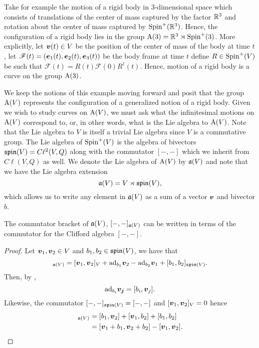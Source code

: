 \documentclass[conf]{new-aiaa}
\begin{document}
\begin{example}
Take for example the motion of a rigid body in 3-dimensional space which consists of translations of the center of mass captured by the factor $\mathbb{R}^3$ and rotation about the center of mass captured by $\operatorname{Spin}^+(\mathbb{R}^3)$. Hence, the configuration of a rigid body lies in the group $\operatorname{A}(3)=\mathbb{R}^3 \rtimes \operatorname{Spin}^+(3)$. More explicitly, let $\boldsymbol{v}(t) \in V$ be the position of the center of mass of the body at time $t$, let $\mathscr{F}(t)=(\boldsymbol{e}_1(t),\boldsymbol{e}_2(t),\boldsymbol{e}_3(t))$ be the body frame at time $t$ define $R \in \operatorname{Spin}^+(V)$ be such that $\mathscr{F}(t)=R(t)\mathscr{F}(0)R^\dagger(t)$. Hence, motion of a rigid body is a curve on the group $\operatorname{A}(3)$.
\end{example}

We keep the notions of this example moving forward and posit that the group $\operatorname{A}(V)$ represents the configuration of a generalized notion of a rigid body. Given we wish to study curves on $\operatorname{A}(V)$, we must ask what the infinitesimal motions on $\operatorname{A}(V)$ correspond to, or, in other words, what is the Lie algebra to $\operatorname{A}(V)$. Note that the Lie algebra to $V$ is itself a trivial Lie algebra since $V$ is a commutative group. The Lie algebra of $\operatorname{Spin}^+(V)$ is the algebra of bivectors $\mathfrak{spin}(V)=C\ell^2(V,Q)$ along with the commutator $[-,-]$ which we inherit from $C\ell(V,Q)$ as well. We denote the Lie algebra of $\operatorname{A}(V)$ by $\mathfrak{a}(V)$ and note that we have the Lie algebra extension
\begin{equation}
\label{eq:extension}
\mathfrak{a}(V)=V\rtimes\mathfrak{spin}(V),
\end{equation}
which allows us to write any element in $\mathfrak{a}(V)$ as a sum of a vector $\boldsymbol{v}$ and bivector $b$. 

\begin{proposition}
The commutator bracket of $\mathfrak{a}(V)$, $[-,-]_{\mathfrak{a}(V)}$ can be written in terms of the commutator for the Clifford algebra $[-,-]$.
\end{proposition}
\begin{proof}
Let $\boldsymbol{v}_1,\boldsymbol{v}_2\in V$ and $b_1,b_2 \in \mathfrak{spin}(V)$, we have that 
\begin{equation}
[\blade{v}_1+b_1,\blade{v}_2+b_2]_{\liealg(V)} = [\blade{v}_1,\blade{v}_2]_{V}+\mathrm{ad}_{b_1}\blade{v}_2 - \mathrm{ad}_{b_2}\blade{v}_1 + [b_1,b_2]_{\spina(V)}.
\end{equation}
Then, by \cite[Lemma 5.7]{gracia-bondia_elements_2001}, 
\begin{equation}
\mathrm{ad}_{b_i}\boldsymbol{v_j}=[b_i,\boldsymbol{v}_j].
\end{equation}
Likewise, the commutator $[-,-]_{\mathfrak{spin}(V)}=[-,-]$ and $[\boldsymbol{v}_1,\boldsymbol{v}_2]_V=0$ hence
\begin{align}
[\blade{v}_1 + b_1,\blade{v}_2+b_2]_{\liealg(V)} &= [b_1,\blade{v}_2] + [\blade{v}_1,b_2] + [b_1,b_2]\\
&= [\blade{v}_1+b_1,\blade{v}_2+b_2]-[\blade{v}_1,\blade{v}_2].
\end{align}
\end{proof}
\end{document}
